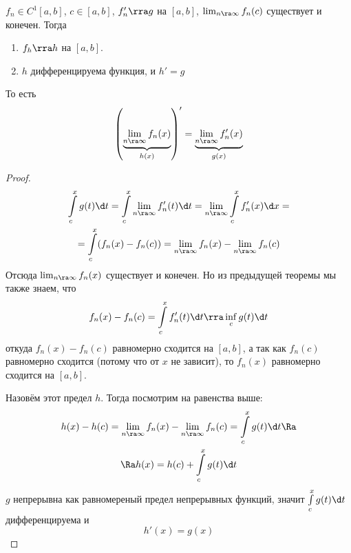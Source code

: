 \begin{theorem}
	$f_n \in C^1[a, b]$, $c \in [a, b]$, $f_n' \rra g$ на $[a, b]$, $\lim_{n \ra \infty} f_n(c)$ существует и конечен.
	Тогда
	\begin{enumerate}
		\item $f_h \rra h$ на $[a, b]$.
		\item $h$ дифференцируема функция, и $h' = g$
	\end{enumerate}
	То есть
	\[ \left(\underbrace{\lim_{n \ra \infty} f_n(x)}_{h(x)}\right)' = \underbrace{\lim_{n \ra \infty} f_n'(x)}_{g(x)} \]
\end{theorem}
\begin{proof}
	\begin{gather*}
		\int\limits_c^x g(t) \d t = \int\limits_c^x \lim_{n \ra \infty} f_n'(t) \d t = \lim_{n \ra \infty} \int\limits_c^x f_n'(x) \d x = \\
		= \int\limits_c^x (f_n(x) - f_n(c)) = \lim_{n \ra \infty} f_n(x) - \lim_{n \ra \infty} f_n(c)
	\end{gather*}
	Отсюда $\lim_{n \ra \infty} f_n(x)$ существует и конечен.
	Но из предыдущей теоремы мы также знаем, что
	\[ f_n(x) - f_n(c) = \int\limits_c^x f_n'(t) \d t \rra \inf\limits_c g(t) \d t \]
	откуда $f_n(x) - f_n(c)$ равномерно сходится на $[a, b]$, а так как $f_n(c)$ равномерно сходится (потому что от $x$ не зависит), то
	$f_n(x)$ равномерно сходится на $[a, b]$.

	Назовём этот предел $h$.
	Тогда посмотрим на равенства выше:
	\begin{gather*}
		h(x) - h(c) = \lim_{n \ra \infty} f_n(x) - \lim_{n \ra \infty} f_n(c) = \int\limits_c^x g(t) \d t \Ra \\
		\Ra h(x) = h(c) + \int\limits_c^x g(t) \d t
	\end{gather*}
	$g$ непрерывна как равномереный предел непрерывных функций, значит $\int\limits_c^x g(t) \d t$ дифференцируема и
	\[ h'(x) = g(x) \]
\end{proof}

